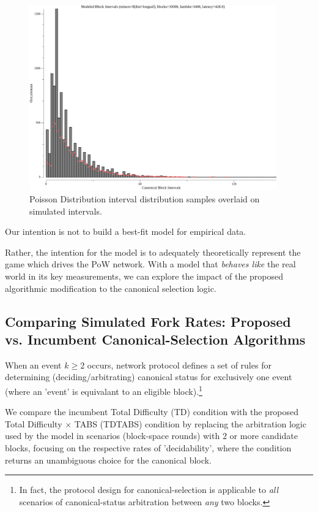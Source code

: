 \documentclass[11pt]{article}
\theoremstyle{plain}
\begin{document}
{\begin{figure}[tph]
    \centering
    \includegraphics[height=8cm]{imgs/sim_a_bravo.png}
    \caption{
      Poisson Distribution interval distribution samples
      overlaid on simulated intervals.
    }
    \label{fig:sim_a_bravo}
\end{figure}

Our intention is not to build a best-fit model for empirical data.

Rather, the intention for the model is to adequately theoretically represent the game
which drives the PoW network. With a model that \emph{behaves like} the real
world in its key measurements, we can explore the impact of the proposed
algorithmic modification to the canonical selection logic.

\subsection{\normalsize{
    Comparing Simulated Fork Rates:
    Proposed vs. Incumbent Canonical-Selection Algorithms
}}

When an event $k \geq 2$ occurs, network protocol defines a set of rules for
determining (deciding/arbitrating) canonical status for exclusively one event
(where an 'event' is equivalant to an eligible block).\footnote{
  In fact, the protocol design for canonical-selection is applicable to \emph{all}
  scenarios of canonical-status arbitration between \emph{any} two blocks.
}

We compare the incumbent Total Difficulty (TD) condition with the proposed
Total Difficulty $\times$ TABS (TDTABS) condition by replacing the arbitration
logic used by the model in scenarios (block-space rounds) with $2$ or more
candidate blocks, focusing on the respective rates of 'decidability', where
the condition returns an unambiguous choice for the canonical block.

}
\end{document}
